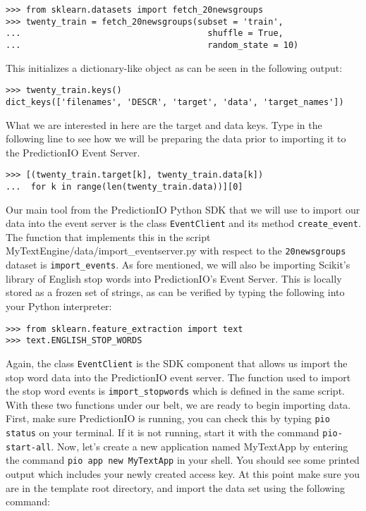 \documentclass[a4paper,12pt]{article}
\renewcommand{\tt}[1]{\texttt{#1}}
\newcommand{\3}{\left}
\newcommand{\4}{\right}
\renewcommand{\-}[1]{{}^{-#1}}
\begin{document}
\begin{verbatim}
>>> from sklearn.datasets import fetch_20newsgroups
>>> twenty_train = fetch_20newsgroups(subset = 'train',
...                                     shuffle = True,
...                                     random_state = 10)
\end{verbatim}

This initializes a dictionary-like object as can be seen in the following output:

\begin{verbatim}
>>> twenty_train.keys()
dict_keys(['filenames', 'DESCR', 'target', 'data', 'target_names'])
\end{verbatim}

What we are interested in here are the target and data keys. Type in the following line to see how we will be preparing the data prior to importing it to the PredictionIO Event Server.

\begin{verbatim}
>>> [(twenty_train.target[k], twenty_train.data[k]) 
...  for k in range(len(twenty_train.data))][0]
\end{verbatim}

Our main tool from the PredictionIO Python SDK that we will use to import our data into the event server is the class \tt{EventClient} and its method \tt{create\_event}. The function that implements this in the script MyTextEngine/data/import\_eventserver.py with respect to the \tt{20newsgroups} dataset is \tt{import\_events}. As fore mentioned, we will also be importing Scikit's library of English stop words into PredictionIO's Event Server. This is locally stored as a frozen set of strings, as can be verified by typing the following into your Python interpreter:

\begin{verbatim}
>>> from sklearn.feature_extraction import text
>>> text.ENGLISH_STOP_WORDS
\end{verbatim}

Again, the class \tt{EventClient} is the SDK component that allows us import the stop word data into the PredictionIO event server. The function used to import the stop word events is \tt{import\_stopwords} which is defined in the same script. With these two functions under our belt, we are ready to begin importing data. First, make sure PredictionIO is running, you can check this by typing \tt{pio status} on your terminal. If it is not running, start it with the command \tt{pio-start-all}. Now, let's create a new application named MyTextApp by entering the command \tt{pio app new MyTextApp} in your shell. You should see some printed output which includes your newly created access key. At this point make sure you are in the template root directory, and import the data set using the following command:
\end{document}
